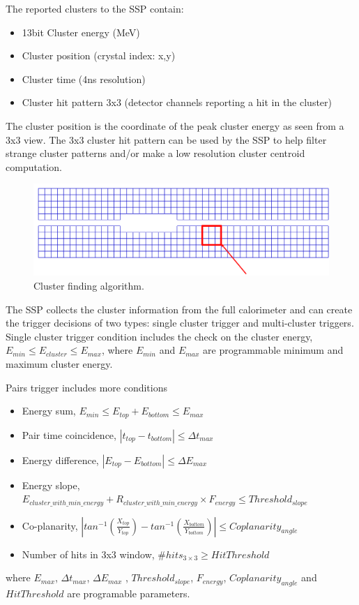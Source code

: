 The reported clusters to the SSP contain:

\begin{itemize}
\item 13bit Cluster energy (MeV)
\item Cluster position (crystal index: x,y)
\item Cluster time (4ns resolution)
\item Cluster hit pattern 3x3 (detector channels reporting a hit in the cluster)
\end{itemize}

The cluster position is the coordinate of the peak cluster energy as seen from a 3x3 view. The 3x3 cluster hit pattern can be used by the SSP to help filter strange cluster patterns and/or make a low resolution cluster centroid computation.

\begin{figure}[h]
\includegraphics[scale=0.4]{daq_trigger/figures/hps_trigger_3x3}
\caption{\small{Cluster finding algorithm.}}
\label{fig:hps_trigger_3x3}
\end{figure}




The SSP collects the cluster information from the full calorimeter and can create the trigger decisions of two types:
single cluster trigger and multi-cluster triggers.
Single cluster trigger condition includes the check on the cluster energy, $E_{min}\le E_{cluster}\le E_{max}$, where $E_{min}$ and $E_{max}$ are programmable minimum and maximum cluster energy.

Pairs trigger includes more conditions
\begin{itemize}
\item Energy sum,  
$E_{min}\le E_{top}+E_{bottom}\le E_{max}$
\item Pair time coincidence, 
$|t_{top}-t_{bottom}|\le \Delta t_{max}$ 
\item Energy difference, 
$|E_{top}-E_{bottom}|\le \Delta E_{max}$ 
\item Energy slope,
$E_{cluster\_with\_min\_energy}+R_{cluster\_with\_min\_energy}\times F_{energy}\le Threshold_{slope}$
\item Co-planarity, 
$|
tan^{-1}(\frac{X_{top}}{Y_{top}})-
tan^{-1}(\frac{X_{bottom}}{Y_{bottom}}) |\le Coplanarity_{angle}$
\item Number of hits in 3x3 window, 
\#$hits_{3\times 3}\ge HitThreshold$
\end{itemize}
\noindent
where $ E_{max}$,  $\Delta t_{max}$, $ \Delta E_{max}$ , $Threshold_{slope}$, 
$F_{energy}$, $Coplanarity_{angle}$
and
$HitThreshold$ are programable parameters.


